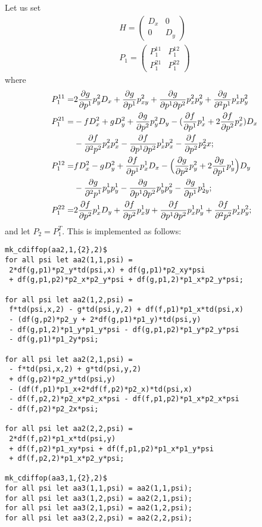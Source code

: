 Let us set
\begin{gather}
  \label{eq:19}
  H=
  \begin{pmatrix}
    D_x & 0 \\ 0 & D_y
  \end{pmatrix}
  \\ 
  P_1=
  \begin{pmatrix}
    P_1^{11} & P_1^{12}
    \\
    P_1^{21} & P_1^{22}
  \end{pmatrix}
\end{gather}
where
\begin{align*}
  P_1^{11} = &
    2 \pd{g}{p^1} p^2_y D_x +
    \pd{g}{p^1} p^2_{xy}  + \pd{g}{p^1\partial p^2} p^2_x p^2_y  +
    \pd{g}{^2p^1} p^1_x p^2_y
    \\
   P_1^{21}=& -f D^2_x
  + g D_y^2 +
  \pd{g}{p^2} p^2_y D_y -
  (\pd{f}{p^1} p^1_x+2 \pd{f}{p^2} p^2_x) D_x
  \\ &
    - \pd{f}{^2p^2} p^2_x p^2_x  - \pd{f}{p^1\partial p^2} p^1_x p^2_x 
    - \pd{f}{p^2} p^2_2x ;
  \\
P_1^{12}=&    f D_x^2 - g D_y^2
  + \pd{f}{p^1} p^1_x D_x -
  \Big(\pd{g}{p^2} p^2_y + 2 \pd{g}{p^1} p^1_y\Big) D_y
  \\
  & - \pd{g}{^2p^1} p^1_y p^1_y  - \pd{g}{p^1\partial p^2} p^1_y p^2_y
  - \pd{g}{p^1} p^1_{2y} ;
  \\
P_1^{22}=&    2 \pd{f}{p^2} p^1_x D_y
  + \pd{f}{p^2} p^1_xy  + \pd{f}{p^1\partial p^2} p^1_x p^1_y 
  + \pd{f}{^2p^2} p^1_x p^2_y ;
\end{align*}
and let $P_2 = P_1^T$. This is implemented as follows:
\begin{verbatim}
mk_cdiffop(aa2,1,{2},2)$
for all psi let aa2(1,1,psi) =
 2*df(g,p1)*p2_y*td(psi,x) + df(g,p1)*p2_xy*psi
 + df(g,p1,p2)*p2_x*p2_y*psi + df(g,p1,2)*p1_x*p2_y*psi;

for all psi let aa2(1,2,psi) =
 f*td(psi,x,2) - g*td(psi,y,2) + df(f,p1)*p1_x*td(psi,x)
 - (df(g,p2)*p2_y + 2*df(g,p1)*p1_y)*td(psi,y)
 - df(g,p1,2)*p1_y*p1_y*psi - df(g,p1,p2)*p1_y*p2_y*psi
 - df(g,p1)*p1_2y*psi;

for all psi let aa2(2,1,psi) =
 - f*td(psi,x,2) + g*td(psi,y,2)
 + df(g,p2)*p2_y*td(psi,y)
 - (df(f,p1)*p1_x+2*df(f,p2)*p2_x)*td(psi,x)
 - df(f,p2,2)*p2_x*p2_x*psi - df(f,p1,p2)*p1_x*p2_x*psi
 - df(f,p2)*p2_2x*psi;

for all psi let aa2(2,2,psi) =
 2*df(f,p2)*p1_x*td(psi,y)
 + df(f,p2)*p1_xy*psi + df(f,p1,p2)*p1_x*p1_y*psi
 + df(f,p2,2)*p1_x*p2_y*psi;

mk_cdiffop(aa3,1,{2},2)$
for all psi let aa3(1,1,psi) = aa2(1,1,psi);
for all psi let aa3(1,2,psi) = aa2(2,1,psi);
for all psi let aa3(2,1,psi) = aa2(1,2,psi);
for all psi let aa3(2,2,psi) = aa2(2,2,psi);
\end{verbatim}

